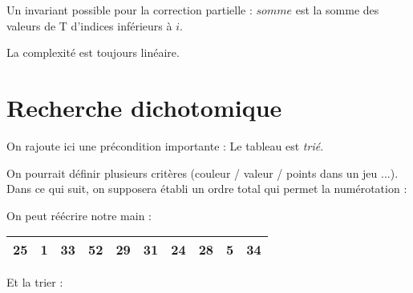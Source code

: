 Un invariant possible pour la correction partielle : $somme$ est la somme des valeurs de T d'indices inférieurs à $i$.

La complexité est toujours linéaire.


\section{Recherche dichotomique}

On rajoute ici une précondition importante : Le tableau est \emph{trié}.

On pourrait définir plusieurs critères (couleur / valeur / points dans un jeu ...). Dans ce qui suit, on supposera établi un ordre total qui permet la numérotation :

\begin{center}
\end{center}

On peut réécrire notre main :

\vspace{-3ex}
\begin{center}
\begin{minipage}{8.5cm}
\begin{tabular}{|c|c|c|c|c|c|c|c|c|c|}
\hline
\small 25&\small 1&\small 33&\small 52&\small 29&\small 31&\small 24&\small 28&\small 5&\small 34\\
\hline
\end{tabular}
\medskip

\end{minipage}\end{center}

Et la trier :

